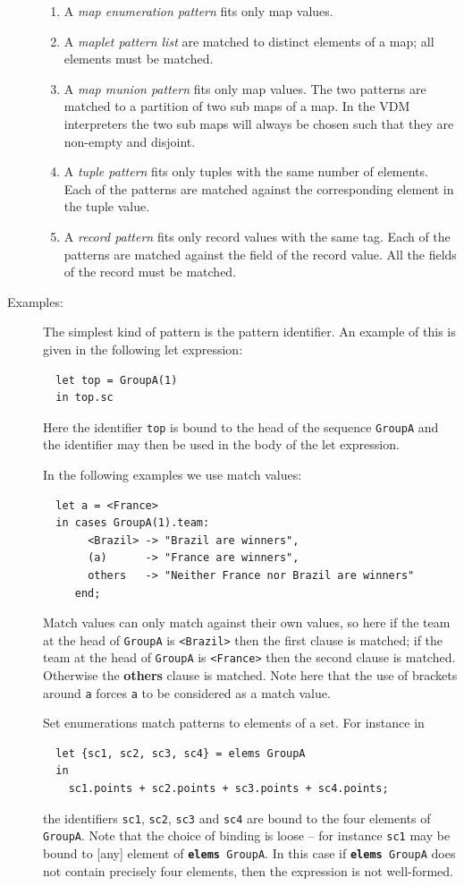 \documentclass{overturerepchap}
\newcommand{\keyw}[1]{{\bf\ttfamily #1}}
\begin{document}
\begin{description}
\begin{enumerate}
  \item A {\it map enumeration pattern} fits only map values. 

  \item A {\it maplet pattern list} are matched to distinct elements of a map; 
   all elements must be matched.

  \item A {\it map munion pattern} fits only map values. 
   The two patterns are matched to a partition of two sub maps of a map.
   In the VDM interpreters the two sub maps will always be chosen such that they are non-empty and disjoint.

  \item A {\it tuple pattern} fits only tuples with the same number of
    elements. Each of the patterns are matched against the corresponding
    element in the tuple value.

  \item A {\it record pattern} fits only record values with the same tag.
    Each of the patterns are matched against the field of the record value.
    All the fields of the record must be matched.
  \end{enumerate}

\item[Examples:] The simplest kind of pattern is the pattern
identifier. An example of this is given in the following let
expression:
\begin{lstlisting}
  let top = GroupA(1)
  in top.sc
\end{lstlisting}
Here the identifier \texttt{top} is bound to the head of the sequence
\texttt{GroupA} and the identifier may then be used in the body of the
let expression.

In the following examples we use match values:
\begin{lstlisting}
  let a = <France>
  in cases GroupA(1).team:
       <Brazil> -> "Brazil are winners",
       (a)      -> "France are winners",
       others   -> "Neither France nor Brazil are winners"
     end;
\end{lstlisting}
Match values can only match against their own values, so here if the
team at the head of \texttt{GroupA} is \texttt{<Brazil>} then the
first clause is matched; if the team at the head of \texttt{GroupA} is
\texttt{<France>} then the second clause is matched. Otherwise the
\keyw{others} clause is matched. Note here that the use of brackets
around \texttt{a} forces \texttt{a} to be considered as a match value.

Set enumerations match patterns to elements of a set. For instance in
\begin{lstlisting}
  let {sc1, sc2, sc3, sc4} = elems GroupA
  in 
    sc1.points + sc2.points + sc3.points + sc4.points;
\end{lstlisting}
the identifiers \texttt{sc1}, \texttt{sc2}, \texttt{sc3} and
\texttt{sc4} are bound to the four elements of \texttt{GroupA}. Note
that the choice of binding is loose -- for instance
\texttt{sc1} may be bound to [any] element of \texttt{\keyw{elems}
GroupA}. In this case if \texttt{\keyw{elems} GroupA} does not contain
precisely four elements, then the expression is not well-formed.


\end{description}
\end{document}
